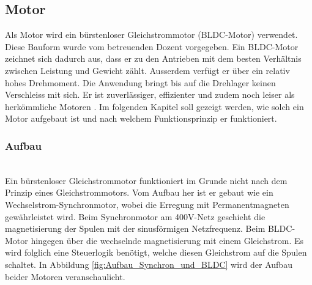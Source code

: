 \subsection{Motor}\label{subsubsec:Motor}

Als Motor wird ein bürstenloser Gleichstrommotor (BLDC-Motor) verwendet. Diese Bauform wurde vom betreuenden Dozent vorgegeben.
Ein BLDC-Motor zeichnet sich dadurch aus, dass er zu den Antrieben mit dem besten Verhältnis zwischen Leistung und Gewicht zählt. Ausserdem verfügt er über ein relativ hohes Drehmoment. Die Anwendung bringt bis auf die Drehlager keinen Verschleiss mit sich. Er ist zuverlässiger, effizienter und zudem noch leiser als herkömmliche Motoren \cite{imajey_consulting_engineers_pvt_ltd_brushless_nodate}. Im folgenden Kapitel soll gezeigt werden, wie solch ein Motor aufgebaut ist und nach welchem Funktionsprinzip er funktioniert.

\subsubsection{Aufbau}\mbox{}\\

Ein bürstenloser Gleichstrommotor funktioniert im Grunde nicht nach dem Prinzip eines Gleichstrommotors. Vom Aufbau her ist er gebaut wie ein Wechselstrom-Synchronmotor, wobei die Erregung mit Permanentmagneten gewährleistet wird. Beim Synchronmotor am 400V-Netz geschieht die magnetisierung der Spulen mit der sinusförmigen Netzfrequenz. Beim BLDC-Motor hingegen über die wechselnde magnetisierung mit einem Gleichstrom. Es wird folglich eine Steuerlogik benötigt, welche diesen Gleichstrom auf die Spulen schaltet. In Abbildung \ref{fig:Aufbau_Synchron_und_BLDC} wird der Aufbau beider Motoren veranschaulicht. \cite{noauthor_burstenloser_2019}


